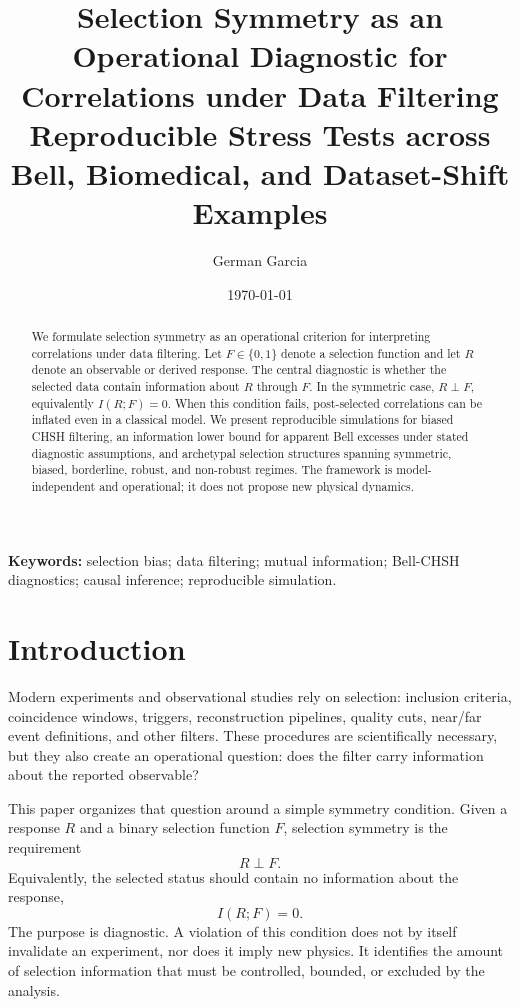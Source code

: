 \documentclass[11pt]{article}
\title{Selection Symmetry as an Operational Diagnostic for Correlations under Data Filtering\\
\large Reproducible Stress Tests across Bell, Biomedical, and Dataset-Shift Examples}
\author{German Garcia}
\date{\today}
\begin{document}
\maketitle

\begin{abstract}
We formulate selection symmetry as an operational criterion for interpreting correlations under data filtering. Let \(F \in \{0,1\}\) denote a selection function and let \(R\) denote an observable or derived response. The central diagnostic is whether the selected data contain information about \(R\) through \(F\). In the symmetric case, \(R \perp F\), equivalently \(I(R;F)=0\). When this condition fails, post-selected correlations can be inflated even in a classical model. We present reproducible simulations for biased CHSH filtering, an information lower bound for apparent Bell excesses under stated diagnostic assumptions, and archetypal selection structures spanning symmetric, biased, borderline, robust, and non-robust regimes. The framework is model-independent and operational; it does not propose new physical dynamics.
\end{abstract}

\noindent\textbf{Keywords:} selection bias; data filtering; mutual information; Bell-CHSH diagnostics; causal inference; reproducible simulation.

\section{Introduction}

Modern experiments and observational studies rely on selection: inclusion criteria, coincidence windows, triggers, reconstruction pipelines, quality cuts, near/far event definitions, and other filters. These procedures are scientifically necessary, but they also create an operational question: does the filter carry information about the reported observable?

This paper organizes that question around a simple symmetry condition. Given a response \(R\) and a binary selection function \(F\), selection symmetry is the requirement
\begin{equation}
R \perp F.
\end{equation}
Equivalently, the selected status should contain no information about the response,
\begin{equation}
I(R;F)=0.
\end{equation}
The purpose is diagnostic. A violation of this condition does not by itself invalidate an experiment, nor does it imply new physics. It identifies the amount of selection information that must be controlled, bounded, or excluded by the analysis.
\end{document}
